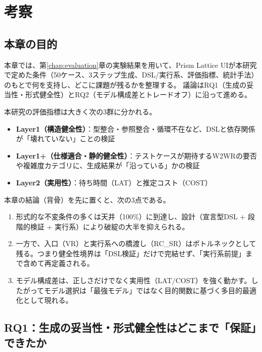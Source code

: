 \documentclass[senior,final,11pt,dvipdfmx]{iputit-thesis}
\begin{document}
\chapter{考察}
\label{chap:discussion}

\section{本章の目的}
\label{sec:disc_intro}

本章では、第\ref{chap:evaluation}章の実験結果を用いて、Prism Lattice UIが本研究で定めた条件（50ケース、3ステップ生成、DSL/実行系、評価指標、統計手法）のもとで何を支持し、どこに課題が残るかを整理する。
議論はRQ1（生成の妥当性・形式健全性）とRQ2（モデル構成差とトレードオフ）に沿って進める。

本研究の評価指標は大きく次の3群に分かれる。
\begin{itemize}
\item \textbf{Layer1（構造健全性）}：型整合・参照整合・循環不在など、DSLと依存関係が「壊れていない」ことの検証
\item \textbf{Layer1+（仕様適合・静的健全性）}：テストケースが期待するW2WRの要否や複雑度カテゴリに、生成結果が「沿っている」かの検証
\item \textbf{Layer2（実用性）}：待ち時間（LAT）と推定コスト（COST）
\end{itemize}

本章の結論（背骨）を先に置くと、次の3点である。
\begin{enumerate}
\item 形式的な不変条件の多くは天井（100\%）に到達し、設計（宣言型DSL + 段階的検証 + 実行系）により破綻の大半を抑えられる。
\item 一方で、入口（VR）と実行系への橋渡し（RC\_SR）はボトルネックとして残る。つまり健全性境界は「DSL検証」だけで完結せず、「実行系前提」まで含めて再定義される。
\item モデル構成差は、正しさだけでなく実用性（LAT/COST）を強く動かす。したがってモデル選択は「最強モデル」ではなく目的関数に基づく多目的最適化として現れる。
\end{enumerate}

\section{RQ1：生成の妥当性・形式健全性はどこまで「保証」できたか}
\label{sec:disc_rq1}
\end{document}
